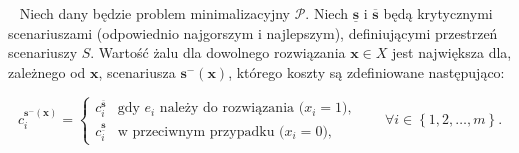 \begin{theorem}\label{th:intminmaxreg}~\cite[$431$]{minmaxSurvey}
	Niech dany będzie problem minimalizacyjny $\mathcal{P}$. Niech $\underline{\textbf{s}}$ i $\overline{\textbf{s}}$ będą krytycznymi scenariuszami (odpowiednio najgorszym i najlepszym), definiującymi przestrzeń scenariuszy $S$. Wartość żalu dla dowolnego rozwiązania $ \textbf{x} \in X$ jest największa dla, zależnego od $\textbf{x}$, scenariusza $\textbf{s}^{-} \left( \textbf{x} \right)$, którego koszty są zdefiniowane następująco:
	
	\begin{equation}
		c^{\textbf{s}^{-} \left( \textbf{x} \right)}_{i} = \left\{\begin{matrix}
			c^{\overline{\textbf{s}}}_{i} & \text{gdy $e_{i}$ należy do rozwiązania ($x_{i} = 1$),}\\ 
			c^{\underline{\textbf{s}}}_{i} &  \text{w przeciwnym przypadku ($x_{i} = 0$),}
		\end{matrix}\right. \qquad \forall i \in \left\{ 1, 2, \dots, m \right\}\text{.}
	\end{equation}
\end{theorem}

